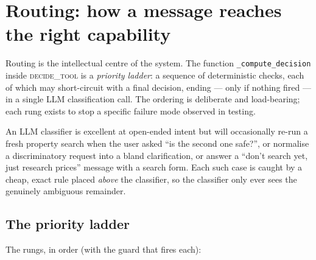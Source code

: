 \documentclass[11pt,a4paper]{article}
\newcommand{\code}[1]{\texttt{\small #1}}
\newcommand{\gnode}[1]{\textsc{#1}}  %
\begin{document}
\section{Routing: how a message reaches the right capability}
\label{sec:routing}

Routing is the intellectual centre of the system. The function
\code{\_compute\_decision} inside \gnode{decide\_tool} is a \emph{priority ladder}:
a sequence of deterministic checks, each of which may short-circuit with a final
decision, ending --- only if nothing fired --- in a single LLM classification call.
The ordering is deliberate and load-bearing; each rung exists to stop a specific
failure mode observed in testing.

\begin{keybox}
An LLM classifier is excellent at open-ended intent but will occasionally re-run a
fresh property search when the user asked ``is the second one safe?'', or normalise a
discriminatory request into a bland clarification, or answer a ``don't search yet,
just research prices'' message with a search form. Each such case is caught by a
cheap, exact rule placed \emph{above} the classifier, so the classifier only ever
sees the genuinely ambiguous remainder.
\end{keybox}

\subsection{The priority ladder}
The rungs, in order (with the guard that fires each):
\end{document}
